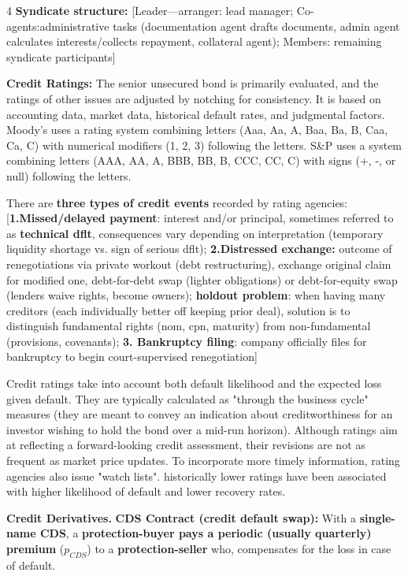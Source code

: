 \documentclass[landscape]{article}
\newcommand{\concept}[1]{\textcolor{conceptcolor}{\textbf{#1}}}
\newcommand{\keyterm}[1]{\textcolor{keycolor}{\textbf{#1}}}
\begin{document}
\begin{multicols}{4}
\textbf{Syndicate structure:} [Leader—arranger: lead manager; Co-agents:administrative tasks (documentation agent drafts documents, admin agent calculates interests/collects repayment, collateral agent); Members: remaining syndicate participants]

\textcolor{subsectioncolor}{\textbf{Credit Ratings:}} The senior unsecured bond is primarily evaluated, and the ratings of other issues are 
adjusted by notching for consistency. It is  based on accounting data, market data, historical default rates, and judgmental factors.
Moody's uses a rating system combining letters (Aaa, Aa, A, Baa, Ba, B, Caa, Ca, C) with numerical modifiers (1, 2, 3) following the letters. S\&P uses a system combining letters (AAA, AA, A, BBB, BB, B, CCC, CC, C) with signs (+, -, or null) following the letters.


There are \textbf{three types of credit events} recorded by rating agencies: [\concept{1.Missed/delayed payment}: interest and/or principal, sometimes referred to as \keyterm{technical dflt}, consequences vary depending on interpretation (temporary liquidity shortage vs. sign of serious dflt); \concept{2.Distressed exchange:} outcome of renegotiations via private workout (debt restructuring), exchange original claim for modified one, debt-for-debt swap (lighter obligations) or debt-for-equity swap (lenders waive rights, become owners); \keyterm{holdout problem}: when having many creditors (each individually better off keeping prior deal), solution is to distinguish fundamental rights (nom, cpn, maturity) from non-fundamental (provisions, covenants); \concept{3. Bankruptcy filing}: company officially files for bankruptcy to begin court-supervised renegotiation]

Credit ratings take into account both default likelihood and the expected loss given default. They are typically calculated as "through the business cycle" measures (they are meant to convey an indication about creditworthiness for an investor wishing to hold 
the bond over a mid-run horizon). Although ratings aim at reflecting a forward-looking credit 
assessment, their revisions are not as frequent as market price updates. To incorporate more 
timely information, rating agencies also issue "watch lists". historically lower ratings have been associated with higher likelihood of default and lower recovery rates. 

\textcolor{subsectioncolor}{\textbf{Credit Derivatives.}}
\textcolor{subsubsectioncolor}{\textbf{CDS Contract (credit default swap):}} With a \textbf{single-name CDS}, a \textbf{protection-buyer pays a periodic (usually quarterly) premium} ($p_{CDS}$) to a \textbf{protection-seller} who, compensates for the loss in case of default.


\end{multicols}
\end{document}
